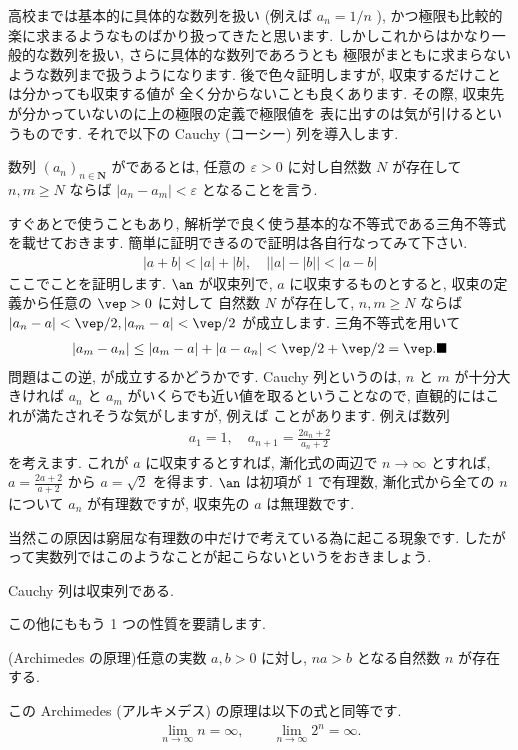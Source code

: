 \documentclass[openany, a4paper, oneside]{jsbook}
\begin{document}
高校までは基本的に具体的な数列を扱い (例えば $a_n = 1/n$ ),
かつ極限も比較的楽に求まるようなものばかり扱ってきたと思います.
しかしこれからはかなり一般的な数列を扱い, さらに具体的な数列であろうとも
極限がまともに求まらないような数列まで扱うようになります.
後で色々証明しますが, 収束するだけことは分かっても収束する値が
全く分からないことも良くあります.
その際, 収束先が分かっていないのに上の極限の定義で極限値を
表に出すのは気が引けるというものです.
それで以下の Cauchy (コーシー) 列を導入します.
\begin{defn}数列 $(a_n)_{n \in \bm{N}}$ がであるとは,
任意の $\varepsilon >0$ に対し自然数 $N$ が存在して
 $n,m \geq N$ ならば $|a_n - a_m|<\varepsilon$ となることを言う.
\end{defn}
すぐあとで使うこともあり, 解析学で良く使う基本的な不等式である三角不等式を載せておきます.
簡単に証明できるので証明は各自行なってみて下さい.
\begin{align}
    |a+b|<|a|+|b|,
    \quad
    \bigl | |a|-|b| \bigr | < |a-b|
\end{align}
ここでことを証明します.
 $\an$ が収束列で,  $a$ に収束するものとすると, 収束の定義から任意の $\vep>0$ に対して
自然数 $N$ が存在して,  $n,m\geq N$ ならば $|a_n-a|<\vep/2,|a_m-a|<\vep/2$ が成立します.
三角不等式を用いて
\begin{align}
    |a_m - a_n|
    \leq
    |a_m - a | + |a - a_n |
    <\vep/2 + \vep/2
    =
    \vep. \blacksquare
\end{align}
問題はこの逆, が成立するかどうかです.
Cauchy 列というのは,  $n$ と $m$ が十分大きければ $a_n$ と $a_m$ がいくらでも近い値を取るということなので,
直観的にはこれが満たされそうな気がしますが, 例えば
ことがあります.
例えば数列
\begin{align}
    a_1=1,
    \quad
    a_{n+1}
    =
    \frac{2a_n+2} {a_n+2}
\end{align}
を考えます. これが $a$ に収束するとすれば, 漸化式の両辺で $n\to\infty$ とすれば,
 $a=\frac{2a+2}{a+2}$ から $a=\sqrt{2}$ を得ます.
 $\an$ は初項が 1 で有理数, 漸化式から全ての $n$ について $a_n$ が有理数ですが, 収束先の $a$ は無理数です.

当然この原因は窮屈な有理数の中だけで考えている為に起こる現象です.
したがって実数列ではこのようなことが起こらないというをおきましょう.
\begin{axm}Cauchy 列は収束列である.
\end{axm}
この他にももう 1 つの性質を要請します.
\begin{axm}(Archimedes の原理)任意の実数 $a,b>0$ に対し,  $n a>b$ となる自然数 $n$ が存在する.
\end{axm}
この Archimedes (アルキメデス) の原理は以下の式と同等です.
\begin{align}
    \lim_{n\to\infty}n=\infty,
    \qquad
    \lim_{n\to\infty}2^n=\infty.
\end{align}
\end{document}

